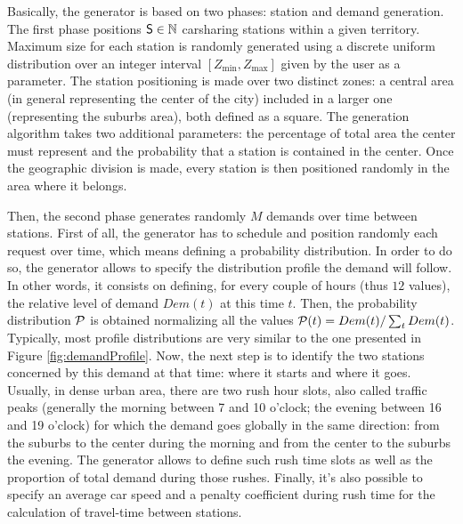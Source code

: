 \begin{bibunit}[ieeetr]
\medskip
Basically, the generator is based on two phases: station and demand generation. The first phase positions $\mathsf{S} \in \mathbb{N}$ carsharing stations within a given territory. Maximum size for each station is randomly generated using a discrete uniform distribution over an integer interval $[Z_{\min}, Z_{\max}]$ given by the user as a parameter.
The station positioning is made over two distinct zones: a central area (in general representing the center of the city) included in a larger one (representing the suburbs area), both defined as a square. The generation algorithm takes two additional parameters: the percentage of total area the center must represent and the probability that a station is contained in the center. Once the geographic division is made, every station is then positioned randomly in the area where it belongs. 


\medskip
Then, the second phase generates randomly $M$ demands over time between stations. First of all, the generator has to schedule and position randomly each request over time, which means defining a probability distribution. In order to do so, the generator allows to specify the distribution profile the demand will follow. In other words, it consists on defining, for every couple of hours (thus $12$ values), the relative level of demand $Dem(t)$ at this time $t$. Then, the probability distribution $\mathcal{P}$ is obtained normalizing all the values \ie ${\mathcal{P}}(t) = Dem(t) \slash \sum_{t}{Dem(t)}$. Typically, most profile distributions are very similar to the one presented in Figure \ref{fig:demandProfile}.
Now, the next step is to identify the two stations concerned by this demand at that time: where it starts and where it goes. Usually, in dense urban area, there are two rush hour slots, also called traffic peaks (generally the morning between 7 and 10 o'clock; the evening between 16 and 19 o'clock) for which the demand goes globally in the same direction: from the suburbs to the center during the morning and from the center to the suburbs the evening. The generator allows to define such rush time slots as well as the proportion of total demand during those rushes. Finally, it's also possible to specify an average car speed and a penalty coefficient during rush time for the calculation of travel-time between stations.


\end{bibunit}
